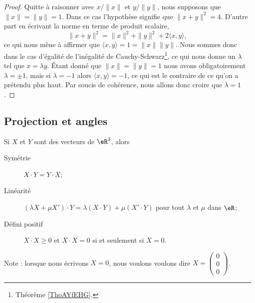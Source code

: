 \begin{proof}
    Quitte à raisonner avec \( x/\| x \|\) et \( y/\| y \|\), nous supposons que \( \| x \|=\| y \|=1\). Dans ce cas l'hypothèse signifie que \( \| x+y \|^2=4\). D'autre part en écrivant la norme en terme de produit scalaire,
    \begin{equation}
        \| x+y \|^2=\| x \|^2+\| y \|^2+2\langle x, y\rangle ,
    \end{equation}
    ce qui nous mène à affirmer que \( \langle x, y\rangle =1=\| x \|\| y \|\). Nous sommes donc dans le cas d'égalité de l'inégalité de Cauchy-Schwarz\footnote{Théorème \ref{ThoAYfEHG}.}, ce qui nous donne un \( \lambda\) tel que \( x=\lambda y\). Étant donné que \( \| x \|=\| y \|=1\) nous avons obligatoirement \( \lambda=\pm 1\), mais si \( \lambda=-1\) alors \( \langle x, y\rangle =-1\), ce qui est le contraire de ce qu'on a prétendu plus haut. Par soucis de cohérence, nous allons donc croire que \( \lambda=1\).
\end{proof}

\subsection{Projection et angles}

\begin{proposition}
	Si $X$ et $Y$ sont des vecteurs de $\eR^3$, alors
	\begin{description}
		\item[Symétrie] $X\cdot Y=Y\cdot X$;
		\item[Linéarité] $(\lambda X+\mu X')\cdot Y=\lambda(X\cdot Y)+\mu(X'\cdot Y)$ pour tout $\lambda$ et $\mu$ dans $\eR$;
		\item[Défini positif] $X\cdot X\geq 0$ et $X\cdot X=0$ si et seulement si $X=0$.
	\end{description}
\end{proposition}
Note : lorsque nous écrivons $X=0$, nous voulons voulons dire $X=\begin{pmatrix}
	0	\\ 
	0	\\ 
	0	
\end{pmatrix}$.


